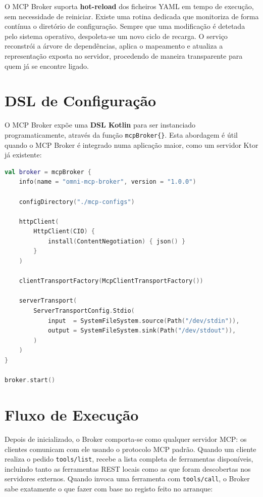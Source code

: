 O MCP Broker suporta \textbf{hot-reload} dos ficheiros YAML em tempo de execução, sem necessidade de reiniciar. Existe uma rotina dedicada que monitoriza de forma contínua o diretório de configuração. Sempre que uma modificação é detetada pelo sistema operativo, despoleta-se um novo ciclo de recarga. O serviço reconstrói a árvore de dependências, aplica o mapeamento e atualiza a representação exposta no servidor, procedendo de maneira transparente para quem já se encontre ligado.


\section{DSL de Configuração}

O MCP Broker expõe uma \textbf{DSL Kotlin} para ser instanciado programaticamente, através da função \texttt{mcpBroker\{\}}. Esta abordagem é útil quando o MCP Broker é integrado numa aplicação maior, como um servidor Ktor já existente:

\vspace{0.5em}
\begin{lstlisting}[caption={Exemplo de configuração do MCP Broker via DSL Kotlin.}, language=Kotlin]
val broker = mcpBroker {
    info(name = "omni-mcp-broker", version = "1.0.0")

    configDirectory("./mcp-configs")

    httpClient(
        HttpClient(CIO) {
            install(ContentNegotiation) { json() }
        }
    )

    clientTransportFactory(McpClientTransportFactory())

    serverTransport(
        ServerTransportConfig.Stdio(
            input  = SystemFileSystem.source(Path("/dev/stdin")),
            output = SystemFileSystem.sink(Path("/dev/stdout")),
        )
    )
}

broker.start()
\end{lstlisting}
\vspace{0.5em}


\section{Fluxo de Execução}

Depois de inicializado, o Broker comporta-se como qualquer servidor MCP: os clientes comunicam com ele usando o protocolo MCP padrão. Quando um cliente realiza o pedido \texttt{tools/list}, recebe a lista completa de ferramentas disponíveis, incluindo tanto as ferramentas REST locais como as que foram descobertas nos servidores externos. Quando invoca uma ferramenta com \texttt{tools/call}, o Broker sabe exatamente o que fazer com base no registo feito no arranque:

